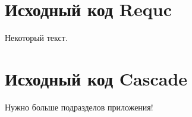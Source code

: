 \begin{appendices}


\chapter{Исходный код Requc} \label{app:requc}

Некоторый текст.

\chapter{Исходный код Cascade} \label{app:cascade}

\begin{comment}
 \section{Подраздел приложения}\label{AppendixB1}
Вот размещается длинная таблица:

\fontsize{14pt}{15pt}\selectfont
\section{Ещё один подраздел приложения} \label{AppendixB2}

Нужно больше подразделов приложения!

\section{Очередной подраздел приложения} \label{AppendixB3}

Нужно больше подразделов приложения!

\section{И ещё один подраздел приложения} \label{AppendixB4}
\end{comment}
Нужно больше подразделов приложения!	
\end{appendices}